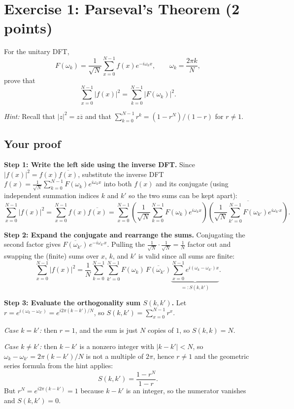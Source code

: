 \documentclass[11pt,a4paper]{article}
\begin{document}
\section*{Exercise 1: Parseval's Theorem (2 points)}

For the unitary DFT,
\[
F(\omega_k)=\frac{1}{\sqrt{N}}\sum_{x=0}^{N-1}f(x)e^{-i\omega_kx},
\qquad \omega_k=\frac{2\pi k}{N},
\]
prove that
\[
\sum_{x=0}^{N-1}|f(x)|^2=\sum_{k=0}^{N-1}|F(\omega_k)|^2.
\]

\noindent\textit{Hint:} Recall that $|z|^2=z\overline{z}$ and that
$\sum_{k=0}^{N-1}r^k=(1-r^N)/(1-r)$ for $r\neq 1$.

\subsection*{Your proof}

\textbf{Step 1: Write the left side using the inverse DFT.}
Since $|f(x)|^2 = f(x)\overline{f(x)}$, substitute the inverse DFT
$f(x) = \frac{1}{\sqrt{N}}\sum_{k=0}^{N-1} F(\omega_k) e^{i\omega_k x}$ into both
$f(x)$ and its conjugate (using independent summation indices $k$ and $k'$ so the two
sums can be kept apart):
\[
\sum_{x=0}^{N-1} |f(x)|^2
= \sum_{x=0}^{N-1} f(x)\overline{f(x)}
= \sum_{x=0}^{N-1} \left(\frac{1}{\sqrt{N}}\sum_{k=0}^{N-1} F(\omega_k) e^{i\omega_k x}\right)
\overline{\left(\frac{1}{\sqrt{N}}\sum_{k'=0}^{N-1} F(\omega_{k'}) e^{i\omega_{k'} x}\right)}.
\]

\textbf{Step 2: Expand the conjugate and rearrange the sums.}
Conjugating the second factor gives $\overline{F(\omega_{k'})}\,e^{-i\omega_{k'}x}$. Pulling
the $\frac{1}{\sqrt{N}}\cdot\frac{1}{\sqrt{N}} = \frac{1}{N}$ factor out and swapping the
(finite) sums over $x$, $k$, and $k'$ is valid since all sums are finite:
\[
\sum_{x=0}^{N-1} |f(x)|^2
= \frac{1}{N}\sum_{k=0}^{N-1}\sum_{k'=0}^{N-1} F(\omega_k)\,\overline{F(\omega_{k'})}
\underbrace{\sum_{x=0}^{N-1} e^{i(\omega_k-\omega_{k'})x}}_{=:S(k,k')}.
\]

\textbf{Step 3: Evaluate the orthogonality sum $S(k,k')$.}
Let $r = e^{i(\omega_k-\omega_{k'})} = e^{i2\pi(k-k')/N}$, so $S(k,k') = \sum_{x=0}^{N-1} r^x$.

\emph{Case $k=k'$:} then $r=1$, and the sum is just $N$ copies of $1$, so $S(k,k)=N$.

\emph{Case $k\neq k'$:} then $k-k'$ is a nonzero integer with $|k-k'|<N$, so
$\omega_k-\omega_{k'}=2\pi(k-k')/N$ is not a multiple of $2\pi$, hence $r\neq 1$ and the
geometric series formula from the hint applies:
\[
S(k,k') = \frac{1-r^N}{1-r}.
\]
But $r^N = e^{i2\pi(k-k')} = 1$ because $k-k'$ is an integer, so the numerator vanishes and
$S(k,k')=0$.
\end{document}
